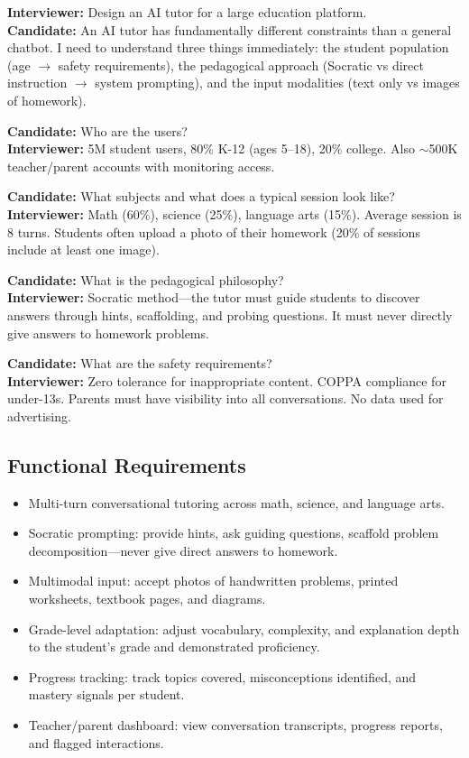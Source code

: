 \textbf{Interviewer:} Design an AI tutor for a large education platform.\\
\textbf{Candidate:} An AI tutor has fundamentally different constraints than a general chatbot. I need to understand three things immediately: the student population (age $\rightarrow$ safety requirements), the pedagogical approach (Socratic vs direct instruction $\rightarrow$ system prompting), and the input modalities (text only vs images of homework).

\textbf{Candidate:} Who are the users?\\
\textbf{Interviewer:} 5M student users, 80\% K-12 (ages 5--18), 20\% college. Also $\sim$500K teacher/parent accounts with monitoring access.

\textbf{Candidate:} What subjects and what does a typical session look like?\\
\textbf{Interviewer:} Math (60\%), science (25\%), language arts (15\%). Average session is 8 turns. Students often upload a photo of their homework (20\% of sessions include at least one image).

\textbf{Candidate:} What is the pedagogical philosophy?\\
\textbf{Interviewer:} Socratic method---the tutor must guide students to discover answers through hints, scaffolding, and probing questions. It must never directly give answers to homework problems.

\textbf{Candidate:} What are the safety requirements?\\
\textbf{Interviewer:} Zero tolerance for inappropriate content. COPPA compliance for under-13s. Parents must have visibility into all conversations. No data used for advertising.

\subsection*{Functional Requirements}

\begin{itemize}
  \item Multi-turn conversational tutoring across math, science, and language arts.
  \item Socratic prompting: provide hints, ask guiding questions, scaffold problem decomposition---never give direct answers to homework.
  \item Multimodal input: accept photos of handwritten problems, printed worksheets, textbook pages, and diagrams.
  \item Grade-level adaptation: adjust vocabulary, complexity, and explanation depth to the student's grade and demonstrated proficiency.
  \item Progress tracking: track topics covered, misconceptions identified, and mastery signals per student.
  \item Teacher/parent dashboard: view conversation transcripts, progress reports, and flagged interactions.
\end{itemize}

